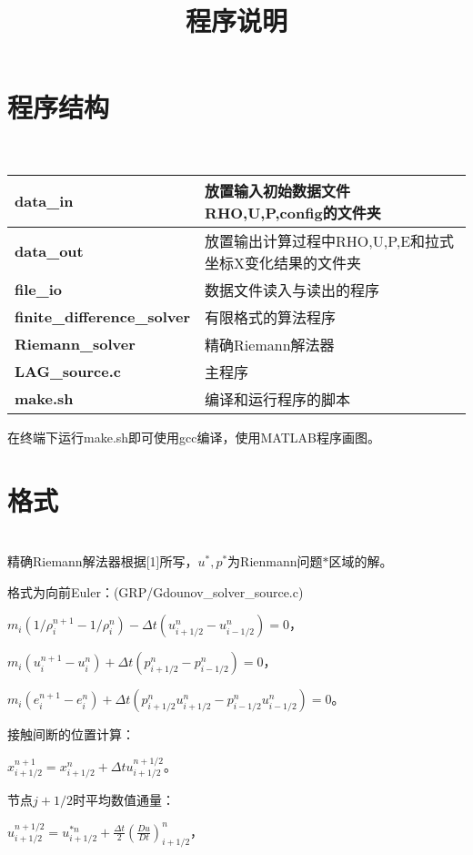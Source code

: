 \documentclass{article}
\begin{document}
\title{程序说明}
\date{}
\maketitle

\section{程序结构}
\ \\
\begin{table}[htbp]
\begin{tabular}{|l|l|}
\hline
\textbf{data\_in}  & 放置输入初始数据文件RHO,U,P,config的文件夹\\
\hline
\textbf{data\_out} & 放置输出计算过程中RHO,U,P,E和拉式坐标X变化结果的文件夹\\
\hline
\textbf{file\_io}  & 数据文件读入与读出的程序\\
\hline
\textbf{finite\_difference\_solver} & 有限格式的算法程序\\
\hline
\textbf{Riemann\_solver} & 精确Riemann解法器\\
\hline
\textbf{LAG\_source.c}   & 主程序\\
\hline
\textbf{make.sh}         & 编译和运行程序的脚本\\
\hline
\end{tabular}
\end{table}

在终端下运行make.sh即可使用gcc编译，使用MATLAB程序画图。

\section{格式}
\ \\

精确Riemann解法器根据[1]所写，$u^{*},p^{*}$为Rienmann问题$*$区域的解。

格式为向前Euler：(GRP/Gdounov\_solver\_source.c)

$m_i(1/\rho_i^{n+1}-1/\rho_i^{n})-\Delta t(u_{i+1/2}^n-u_{i-1/2}^n)=0$，

$m_i(u_i^{n+1}-u_i^{n})+\Delta t(p_{i+1/2}^n-p_{i-1/2}^n)=0$，

$m_i(e_i^{n+1}-e_i^{n})+\Delta t(p_{i+1/2}^nu_{i+1/2}^n-p_{i-1/2}^nu_{i-1/2}^n)=0$。

接触间断的位置计算：

$x_{i+1/2}^{n+1}=x_{i+1/2}^{n}+\Delta tu_{i+1/2}^{n+1/2}$。

节点$j+1/2$时平均数值通量：

$u_{i+1/2}^{n+1/2}=u_{i+1/2}^{*n}+\frac{\Delta t}{2}(\frac{D u}{D t})_{i+1/2}^{n}$，
\end{document}
